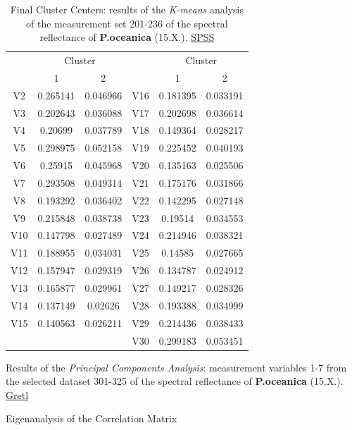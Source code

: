 \documentclass[10pt, a4paper]{article}
\begin{document}
\begin{appendices}
\begin{table}[htbp]
	\caption{Final Cluster Centers: results of the \textit{K-means} analysis of the measurement set 201-236 of the spectral reflectance of \textbf{P.oceanica} (15.X.).  \href{http://www.spss.com/}{SPSS}}
	\begin{center}
	\begin{tabular}{|c|c|c|c|c|c|}
	\hline\hline
		& \multicolumn{2}{|c|}{Cluster} &  & \multicolumn{2}{|c|}{Cluster}\\
		 & 1 & 2 &  & 1 & 2 \\ \hline\hline
		V2  &	0.265141 &	0.046966 &	V16 &	0.181395 &	0.033191 \\ \hline
		V3 &	0.202643 &	0.036088 &	V17 &	0.202698 &	0.036614 \\ \hline
		V4 &	0.20699 &	0.037789 &	V18 &	0.149364 &	0.028217 \\ \hline
		V5 &	0.298975 &	0.052158 &	V19 &	0.225452 &	0.040193 \\ \hline
		V6 &	0.25915 &	0.045968 &	V20 &	0.135163 &	0.025506 \\ \hline
		V7 &	0.293508 &	0.049314 &	V21 &	0.175176 &	0.031866 \\ \hline
		V8 &	0.193292 &	0.036402 &	V22 &	0.142295 &	0.027148 \\ \hline
		V9 &	0.215848 &	0.038738 &	V23 &	0.19514 &	0.034553 \\ \hline
		V10 &	0.147798 &	0.027489 &	V24 &	0.214946 &	0.038321 \\ \hline
		V11 &	0.188955 &	0.034031 &	V25 &	0.14585 &	0.027665 \\ \hline
		V12 &	0.157947 &	0.029319 &	V26 &	0.134787 &	0.024912 \\ \hline
		V13 &	0.165877 &	0.029961 &	V27 &	0.149217 &	0.028326 \\ \hline
		V14 &	0.137149 &	0.02626 &	V28 &	0.193388 &	0.034999 \\ \hline
		V15 &	0.140563 &	0.026211 &	V29 &	0.214436 &	0.038433 \\ \hline
		 &	 &	 &	V30	 & 0.299183	 & 0.053451 \\ \hline
	\end{tabular}
	\end{center}
	\label{tab:23}
\end{table}

\begin{table}[H]
	\caption{Results of the \textit{Principal Components Analysis}: measurement variables 1-7 from the selected dataset 301-325 of the spectral reflectance of \textbf{P.oceanica} (15.X.). \href{http://gretl.sourceforge.net/}{Gretl}}
	\begin{center}
	Eigenanalysis of the Correlation Matrix\\
	\vspace{1em}


\end{center}
\end{table}
\end{appendices}
\end{document}
